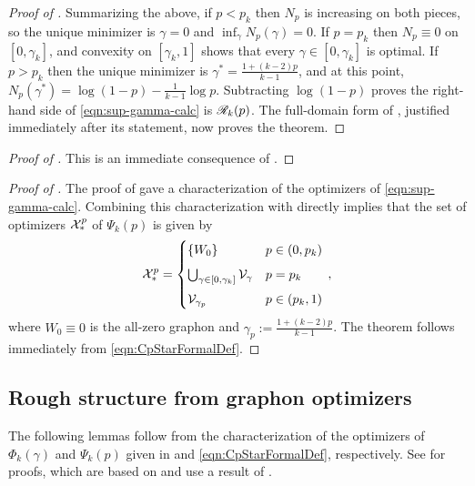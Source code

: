 \begin{proof}[Proof of ]
Summarizing the above, if $p<p_k$ then $N_p$ is increasing on both pieces, so the unique minimizer is $\gamma=0$ and $\inf_\gamma N_p(\gamma)=0$. If $p=p_k$ then $N_p\equiv0$ on $[0,\gamma_k]$, and convexity on $[\gamma_k,1]$ shows that every $\gamma\in[0,\gamma_k]$ is optimal. If $p>p_k$ then the unique minimizer is $\gamma^*=\frac{1+(k-2)p}{k-1}$, and at this point, $N_p(\gamma^\ast)=\log(1-p)-\frac{1}{k-1}\log p$. Subtracting $\log(1-p)$ proves the right-hand side of \eqref{eqn:sup-gamma-calc} is ${\mathscr R}_k(p)$. The full-domain form of , justified immediately after its statement, now proves the theorem.
\end{proof}

\begin{proof}[Proof of ]
This is an immediate consequence of .
\end{proof}

\begin{proof}[Proof of ]
The proof of  gave a characterization of the optimizers of \eqref{eqn:sup-gamma-calc}. Combining this characterization with  directly implies that the set of optimizers ${\mathcal X}^p_\ast$ of $\Psi_k(p)$ is given by
\begin{equation}\label{eqn:CpStarFormalDef}
{\mathcal X}^p_\ast=\begin{cases}\{W_0\}&p\in(0,p_k)\\[5pt]\bigcup_{\gamma\in[0,\gamma_k]}{\mathcal V}_\gamma&p=p_k\\[5pt]{\mathcal V}_{\gamma_p}&p\in(p_k,1)\end{cases}\,,
\end{equation}
where $W_0\equiv0$ is the all-zero graphon and $\gamma_p:=\frac{1+(k-2)p}{k-1}$. The theorem follows immediately from \eqref{eqn:CpStarFormalDef}.
\end{proof}

\subsection{Rough structure from graphon optimizers}
The following lemmas follow from the characterization of the optimizers of $\Phi_k(\gamma)$ and $\Psi_k(p)$ given in  and \eqref{eqn:CpStarFormalDef}, respectively. See \cite[Propositions~3.8~\&~3.9]{perkins2025typical} for proofs, which are based on \citeauthor{chatterjee2011large} \cite[Theorem~3.1]{chatterjee2011large} and use a result of \citeauthor{hatami2018graph} \cite{hatami2018graph}.

